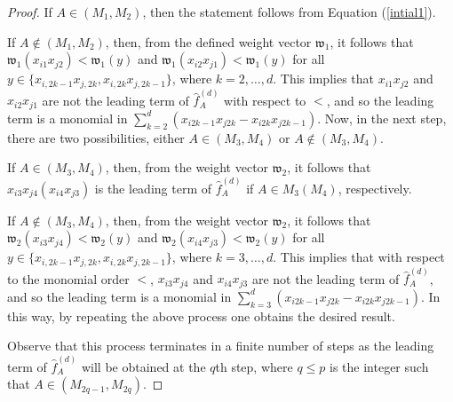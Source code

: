 \documentclass[10pt,a4paper]{amsart}
\begin{document}
\begin{proof}
If $A \in (M_{1},M_{2})$, then the statement follows from Equation (\ref{intial1}).

If $A \notin (M_{1},M_{2})$, then, from the defined weight vector $\mathfrak{w}_{1}$, it follows that $\mathfrak{w}_{1}(x_{i1}x_{j2})<\mathfrak{w}_{1}(y)$ and $\mathfrak{w}_{1}(x_{i2}x_{j1})<\mathfrak{w}_{1}(y)$ for all $y \in \{x_{i,2k-1}x_{j,2k},x_{i,2k}x_{j,2k-1}\}$, where $k=2,\ldots, d$. This implies that $x_{i1}x_{j2}$ and $x_{i2}x_{j1}$ are not the leading term of $\hat{f}_A^{(d)}$ with respect to $<$, and so the leading term is a monomial in $\sum_{k=2}^d(x_{i2k-1}x_{j2k}-x_{i2k}x_{j2k-1})$. Now, in the next step, there are two possibilities, either $A \in (M_{3},M_{4})$ or $A \notin (M_{3},M_{4})$. 

If $A \in (M_{3},M_{4})$, then, from the weight vector $\mathfrak{w}_{2}$, it follows that $x_{i3}x_{j4} (x_{i4}x_{j3})$ is the leading term of $\hat{f}_A^{(d)}$ if $A \in M_3 (M_4)$, respectively. 

If $A \notin (M_{3},M_{4})$, then, from the weight vector $\mathfrak{w}_{2}$, it follows that $\mathfrak{w}_{2}(x_{i3}x_{j4})<\mathfrak{w}_{2}(y)$ and $\mathfrak{w}_{2}(x_{i4}x_{j3})<\mathfrak{w}_{2}(y)$ for all $y \in \{x_{i,2k-1}x_{j,2k},x_{i,2k}x_{j,2k-1}\}$, where $k=3,\ldots, d$. This implies that with respect to the monomial order $<$, $x_{i3}x_{j4}$ and $x_{i4}x_{j3}$ are not the leading term of $\hat{f}_A^{(d)}$, and so the leading term is a monomial in $\sum_{k=3}^d(x_{i2k-1}x_{j2k}-x_{i2k}x_{j2k-1})$. 
In this way, by repeating the above process one obtains the desired result. 

Observe that this process terminates in a finite number of steps as the leading term of $\hat{f}_A^{(d)}$ will be obtained at the $q$th step, where $q \leq p$ is the integer such that $A \in (M_{2q-1},M_{2q})$.
\end{proof}
\end{document}

